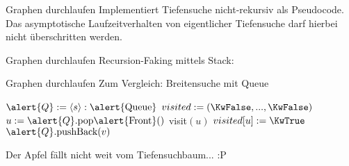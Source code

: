 \begin{frame}{Graphen durchlaufen}
	Implementiert Tiefensuche nicht-rekursiv als Pseudocode. Das asymptotische Laufzeitverhalten von eigentlicher Tiefensuche darf hierbei nicht überschritten werden.
\end{frame}

\begin{frame}{Graphen durchlaufen}
	\solutionheading
	Recursion-Faking mittels Stack: 
	\begin{algorithm}[H]
	\end{algorithm}
	\vphantom{\impl Tp}
\end{frame}

\begin{frame}{Graphen durchlaufen}
	\solutionheading
	Zum Vergleich: Breitensuche mit Queue
	\begin{algorithm}[H]
		 {
			$\alert{Q} := \llist{s}: \alert{\|Queue|}$ \;
			$visited := (\KwFalse, ... , \KwFalse)$\;
			 {
				$u := \alert{Q}.\text{pop\alert{Front}}()$\;
				 {
					visit$(u)$  \;
					$visited[u] := \KwTrue$\;
					 {
						$\alert{Q}.\text{pushBack}(v)$\;
					}
				}
			}
		}
	\end{algorithm}
	\impl Der Apfel fällt nicht weit vom Tiefensuchbaum... :P
\end{frame}



